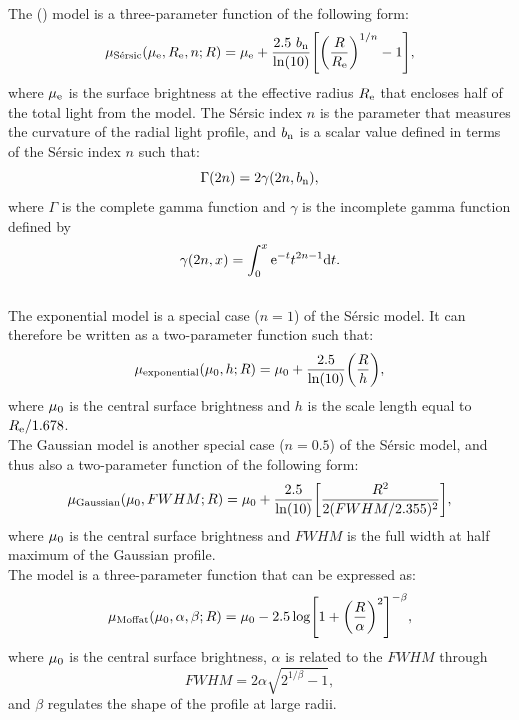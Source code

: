 \documentclass[preprint2]{emulateapj}
\begin{document}
The \citeauthor{sersic1963} (\citeyear{sersic1963,sersic1968}) model is a three-parameter function of the following form:
\begin{equation}
\mu_{\rm S\acute{e}rsic}(\mu_{\rm e},R_{\rm e},n;R) = \mu_{\rm e} + \frac{2.5~b_{\rm n}}{\ln(10)} 
\Biggl[\biggl(\frac{R}{R_{\rm e}}\biggr)^{1/n}-1\Biggr] ,
\end{equation}
\citep{caon1993,andredakis1995,grahamdriver2005}
where $\mu_{\rm e}$ is the surface brightness at the effective radius $R_{\rm e}$ that encloses 
half of the total light from the model. 
The S\'ersic index $n$ is the parameter that measures the curvature of the radial light profile,
and $b_{\rm n}$ is a scalar value defined in terms of the S\'ersic index $n$ such that:
\begin{equation}
\Gamma(2n) = 2\gamma(2n,b_{\rm n}),
\end{equation}
where $\Gamma$ is the complete gamma function \citep{ciotti1991} 
and $\gamma$ is the incomplete gamma function defined by 
\begin{equation}
\gamma(2n,x) = \int_{0}^{x} {\rm e}^{-t} t^{2n-1} {\rm d}t .
\end{equation} \\

The exponential model is a special case ($n=1$) of the S\'ersic model.
It can therefore be written as a two-parameter function such that:
\begin{equation}
\mu_{\rm exponential}(\mu_{\rm 0},h;R) = \mu_{\rm 0} + \frac{2.5}{\ln(10)} \biggl(\frac{R}{h} \biggr) ,
\end{equation}
where $\mu_{\rm 0}$ is the central surface brightness and $h$ is the scale length equal to $R_{\rm e}/1.678$. \\

The Gaussian model is another special case ($n=0.5$) of the S\'ersic model, and thus also a two-parameter function of the following form:
\begin{equation}
\mu_{\rm Gaussian}(\mu_{\rm 0},FWHM;R) = \mu_{\rm 0} + \frac{2.5}{\ln(10)} 
\biggl[\frac{R^2}{2(FWHM/2.355)^2} \biggr] ,
\label{eq:gauss}
\end{equation}
where $\mu_{\rm 0}$ is the central surface brightness 
and $FWHM$ is the full width at half maximum of the Gaussian profile. \\

The \cite{moffat1969} model is a three-parameter function that can be expressed as:
\begin{equation}
\mu_{\rm Moffat}(\mu_{\rm 0},\alpha,\beta;R) = \mu_{\rm 0} - 2.5 
\log \Biggl[ 1 + \biggl( \frac{R}{\alpha} \biggr)^2 \Biggr]^{-\beta} ,
\end{equation}
where $\mu_{\rm 0}$ is the central surface brightness,
$\alpha$ is related to the $FWHM$ through 
\begin{equation}
FWHM = 2\alpha \sqrt{2^{1/\beta}-1} ,
\end{equation}
and $\beta$ regulates the shape of the profile at large radii. \\
\end{document}
